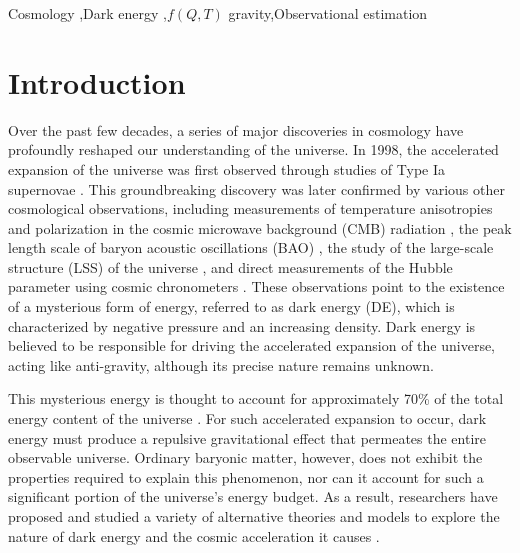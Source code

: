 \documentclass[a4paper,fleqn]{cas-sc}
\begin{document}
\begin{keywords}
Cosmology \sep Dark energy \sep $f(Q,T)$ gravity\sep Observational estimation
\end{keywords}

\maketitle

\section{Introduction} \label{sec:intro}

Over the past few decades, a series of major discoveries in cosmology have profoundly reshaped our understanding of the universe. In 1998, the accelerated expansion of the universe was first observed through studies of Type Ia supernovae \cite{perlmutter_discovery_1998, Riess_1998}. This groundbreaking discovery was later confirmed by various other cosmological observations, including measurements of temperature anisotropies and polarization in the cosmic microwave background (CMB) radiation \cite{1992ApJ...396L...1S, 2020Planck}, the peak length scale of baryon acoustic oscillations (BAO) \cite{Eisenstein_2005, 10.1111/j.1365-2966.2011.19592.x}, the study of the large-scale structure (LSS) of the universe \cite{Dodelson_2002, Percival_2007}, and direct measurements of the Hubble parameter using cosmic chronometers \cite{Daniel_Stern_2010, Moresco_2015}. These observations point to the existence of a mysterious form of energy, referred to as dark energy (DE), which is characterized by negative pressure and an increasing density. Dark energy is believed to be responsible for driving the accelerated expansion of the universe, acting like anti-gravity, although its precise nature remains unknown.

This mysterious energy is thought to account for approximately 70\% of the total energy content of the universe \cite{PhysRevD.37.3406, PhysRevD.63.103510, 10.1143/PTP.106.929}. For such accelerated expansion to occur, dark energy must produce a repulsive gravitational effect that permeates the entire observable universe. Ordinary baryonic matter, however, does not exhibit the properties required to explain this phenomenon, nor can it account for such a significant portion of the universe's energy budget. As a result, researchers have proposed and studied a variety of alternative theories and models to explore the nature of dark energy and the cosmic acceleration it causes \cite{10.1093/oso/9780198526827.001.0001}.
\end{document}
